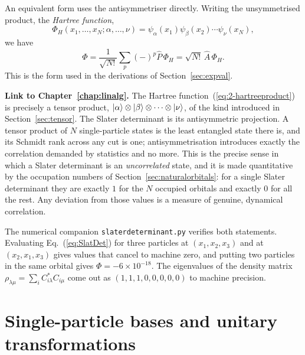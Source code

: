 An equivalent form uses the antisymmetriser directly.  Writing the
unsymmetrised product, the \emph{Hartree function},
\begin{equation}
  \Phi_H(x_1,\dots,x_N;\alpha,\dots,\nu)
   = \psi_{\alpha}(x_1)\psi_{\beta}(x_2)\cdots\psi_{\nu}(x_N),
  \label{eq:2-hartreeproduct}
\end{equation}
we have
\begin{equation}
  \Phi = \frac{1}{\sqrt{N!}}\sum_{p}(-)^{p}\hat{P}\,\Phi_H
       = \sqrt{N!}\,\hat{A}\,\Phi_H .
  \label{eq:2-slaterasA}
\end{equation}
This is the form used in the derivations of Section~\ref{sec:expval}.

\begin{notebox}
\textbf{Link to Chapter~\ref{chap:linalg}.} The Hartree
function~(\ref{eq:2-hartreeproduct}) is precisely a tensor product,
$\vert \alpha \rangle\otimes\vert \beta \rangle\otimes\cdots\otimes\vert \nu \rangle$, of the kind
introduced in Section~\ref{sec:tensor}.  The Slater determinant is its
antisymmetric projection.  A tensor product of $N$ single-particle states is
the least entangled state there is, and its Schmidt rank across any cut is
one; antisymmetrisation introduces exactly the correlation demanded by
statistics and no more.  This is the precise sense in which a Slater
determinant is an \emph{uncorrelated} state, and it is made quantitative by
the occupation numbers of Section~\ref{sec:naturalorbitals}: for a single
Slater determinant they are exactly $1$ for the $N$ occupied orbitals and
exactly $0$ for all the rest.  Any deviation from those values is a measure of
genuine, dynamical correlation.
\end{notebox}

The numerical companion \texttt{slaterdeterminant.py} verifies both
statements.  Evaluating Eq.~(\ref{eq:SlatDet}) for three particles at
$(x_1,x_2,x_3)$ and at $(x_2,x_1,x_3)$ gives values that cancel to machine
zero, and putting two particles in the same orbital gives
$\Phi=-6\times10^{-18}$.  The eigenvalues of the density matrix
$\rho_{\lambda\mu}=\sum_i C^*_{i\lambda}C_{i\mu}$ come out as
$(1,1,1,0,0,0,0,0)$ to machine precision.

\section{Single-particle bases and unitary transformations}
\label{sec:basischange}

